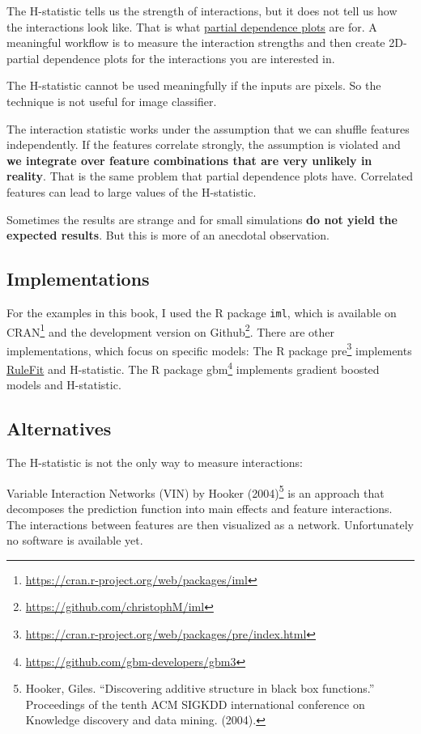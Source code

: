 \documentclass[
  10pt,
]{scrbook}
\renewcommand{\href}[2]{#2\footnote{\url{#1}}}
\begin{document}
The H-statistic tells us the strength of interactions, but it does not tell us how the interactions look like.
That is what \protect\hyperlink{pdp}{partial dependence plots} are for.
A meaningful workflow is to measure the interaction strengths and then create 2D-partial dependence plots for the interactions you are interested in.

The H-statistic cannot be used meaningfully if the inputs are pixels.
So the technique is not useful for image classifier.

The interaction statistic works under the assumption that we can shuffle features independently.
If the features correlate strongly, the assumption is violated and \textbf{we integrate over feature combinations that are very unlikely in reality}.
That is the same problem that partial dependence plots have.
Correlated features can lead to large values of the H-statistic.

Sometimes the results are strange and for small simulations \textbf{do not yield the expected results}.
But this is more of an anecdotal observation.

\hypertarget{implementations}{%
\subsection{Implementations}\label{implementations}}

For the examples in this book, I used the R package \texttt{iml}, which is available on \href{https://cran.r-project.org/web/packages/iml}{CRAN} and the development version on \href{https://github.com/christophM/iml}{Github}.
There are other implementations, which focus on specific models:
The R package \href{https://cran.r-project.org/web/packages/pre/index.html}{pre} implements \protect\hyperlink{rulefit}{RuleFit} and H-statistic.
The R package \href{https://github.com/gbm-developers/gbm3}{gbm} implements gradient boosted models and H-statistic.

\hypertarget{alternatives}{%
\subsection{Alternatives}\label{alternatives}}

The H-statistic is not the only way to measure interactions:

Variable Interaction Networks (VIN) by Hooker (2004)\footnote{Hooker, Giles. ``Discovering additive structure in black box functions.'' Proceedings of the tenth ACM SIGKDD international conference on Knowledge discovery and data mining. (2004).} is an approach that decomposes the prediction function into main effects and feature interactions.
The interactions between features are then visualized as a network.
Unfortunately no software is available yet.
\end{document}
